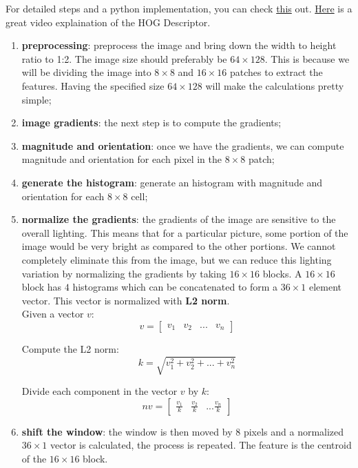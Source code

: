 \documentclass{article}
\begin{document}
For detailed steps and a python implementation, you can check \href{https://www.analyticsvidhya.com/blog/2019/09/feature-engineering-images-introduction-hog-feature-descriptor/}{this} out.
\href{https://www.analyticsvidhya.com/blog/2019/09/feature-engineering-images-introduction-hog-feature-descriptor/}{Here} is a great video explaination of the HOG Descriptor.

\begin{enumerate}[start=0]
    \item \textbf{preprocessing}: preprocess the image and bring down the width to height ratio to 1:2. The image size should preferably be $64\times 128$. This is because we will be dividing the image into $8\times8$ and $16\times16$ patches to extract the features. Having the specified size $64\times 128$ will make the calculations pretty simple;
    \item \textbf{image gradients}: the next step is to compute the gradients;
    \item \textbf{magnitude and orientation}: once we have the gradients, we can compute magnitude and orientation for each pixel in the $8\times 8$ patch;
    \item \textbf{generate the histogram}: generate an histogram with magnitude and orientation for each $8\times 8$ cell;
    \item \textbf{normalize the gradients}: the gradients of the image are sensitive to the overall lighting. This means that for a particular picture, some portion of the image would be very bright as compared to the other portions. We cannot completely eliminate this from the image, but we can reduce this lighting variation by normalizing the gradients by taking $16\times 16$ blocks. A $16\times 16$ block has $4$ histograms which can be concatenated to form a $36\times 1$ element vector. This vector is normalized with \textbf{L2 norm}. \\

    Given a vector $v$:
    \begin{equation*}
        v = \begin{bmatrix}
            v_1 & v_2 & ... & v_n
        \end{bmatrix}
    \end{equation*}

    Compute the L2 norm:
    \begin{equation*}
        k = \sqrt{v_1^2 + v_2^2 + ... + v_n^2}
    \end{equation*}

    Divide each component in the vector $v$ by $k$:
    \begin{equation*}
        nv = \begin{bmatrix}
            \frac{v_1}{k} & \frac{v_2}{k} & ... \frac{v_n}{k} 
        \end{bmatrix}
    \end{equation*}

    \item \textbf{shift the window}: the window is then moved by $8$ pixels and a normalized $36\times 1$ vector is calculated, the process is repeated. The feature is the centroid of the $16\times 16$ block.

\end{enumerate}
\end{document}
